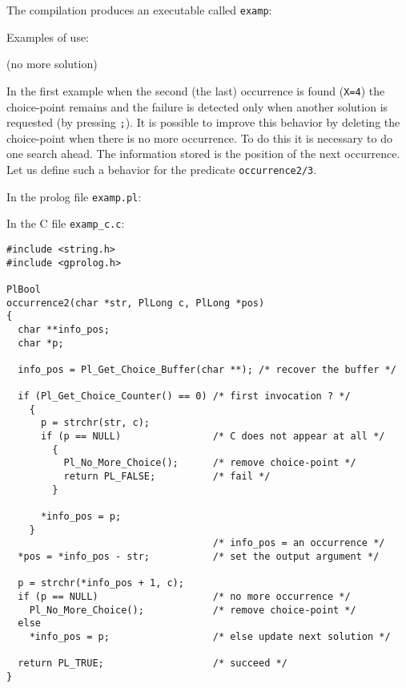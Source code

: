 The compilation produces an executable called \texttt{examp}:


Examples of use:

\begin{CodeTwoCols}
\SkipLine
{}
\SkipLine
{}
\SkipLine
{}     {(no more solution)}
\SkipLine
{}
\SkipLine
{}
\end{CodeTwoCols}

In the first example when the second (the last) occurrence is found
(\texttt{X=4}) the choice-point remains and the failure is detected only when
another solution is requested (by pressing \texttt{;}). It is possible to
improve this behavior by deleting the choice-point when there is no more
occurrence. To do this it is necessary to do one search ahead. The
information stored is the position of the next occurrence. Let us define such
a behavior for the predicate \texttt{occurrence2/3}.

In the prolog file \texttt{examp.pl}:


In the C file \texttt{examp\_c.c}:

\begin{Indentation}
\begin{verbatim}
#include <string.h>
#include <gprolog.h>

PlBool
occurrence2(char *str, PlLong c, PlLong *pos)
{
  char **info_pos;
  char *p;

  info_pos = Pl_Get_Choice_Buffer(char **); /* recover the buffer */

  if (Pl_Get_Choice_Counter() == 0) /* first invocation ? */
    {
      p = strchr(str, c);
      if (p == NULL)                /* C does not appear at all */
        {
          Pl_No_More_Choice();      /* remove choice-point */
          return PL_FALSE;          /* fail */
        }

      *info_pos = p;
    }
                                    /* info_pos = an occurrence */
  *pos = *info_pos - str;           /* set the output argument */

  p = strchr(*info_pos + 1, c);
  if (p == NULL)                    /* no more occurrence */
    Pl_No_More_Choice();            /* remove choice-point */
  else
    *info_pos = p;                  /* else update next solution */

  return PL_TRUE;                   /* succeed */
}
\end{verbatim}
\end{Indentation}

